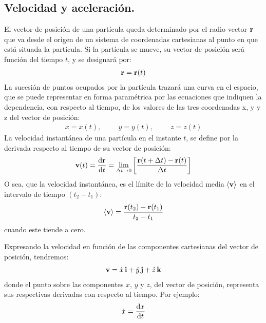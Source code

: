 \documentclass[12pt]{article}
\begin{document}
\subsection{Velocidad y aceleración.} 

El vector de posición de una partícula queda determinado por el radio vector $\vb{r}$ que va desde el origen de un sistema de coordenadas cartesianas al punto en que está situada la partícula. Si la partícula se mueve, su vector de posición será función del tiempo $t$, y se designará por:
\begin{align}
\vb{r} = \vb{r} (t)
\label{eq:ecuacion_02_01} 
\end{align}
La sucesión de puntos ocupados por la partícula trazará una curva en el espacio, que se puede representar en forma paramétrica por las ecuaciones que indiquen la dependencia, con respecto al tiempo, de los valores de las tres coordenadas x, y y z del vector de posición: 
\begin{align}
x = x (t), \hspace{1cm} y = y (t), \hspace{1cm} z = z (t)
\label{eq:ecuacion_02_02} 
\end{align}
La velocidad instantánea de una partícula en el instante $t$, se define por la derivada respecto al tiempo de su vector de posición:
\begin{align}
\vb{v} (t) = \dv{\vb{r}}{t} = \lim_{\Delta t \to 0} \left[ \dfrac{\vb{r} (t + \Delta t) - \vb{r} (t)}{\Delta t} \right]
\label{eq:ecuacion_02_03} 
\end{align}
O sea, que la velocidad instantánea, es el límite de la velocidad media $\expval{\vb{v}}$ en el intervalo de tiempo $(t_{2} - t_{1})$:
\begin{align}
\expval{\vb{v}} = \dfrac{\vb{r} (t_{2}) - \vb{r} (t_{1})}{t_{2} - t_{1}}
\label{eq:ecuacion_02_04} 
\end{align}
cuando este tiende a cero.
\par
Expresando la velocidad en función de las componentes cartesianas del vector de posición, tendremos:
\begin{align}
\vb{v} = \dot{x} \, \vb{i} + \dot{y} \, \vb{j} + \dot{z} \, \vb{k}
\label{eq:ecuacion_02_05}
\end{align}
donde el punto sobre las componentes $x$, $y$ y $z$, del vector de posición, representa sus respectivas derivadas con respecto al tiempo. Por ejemplo:
\begin{align*}
\dot{x} = \dv{x}{t}
\end{align*}
\end{document}
